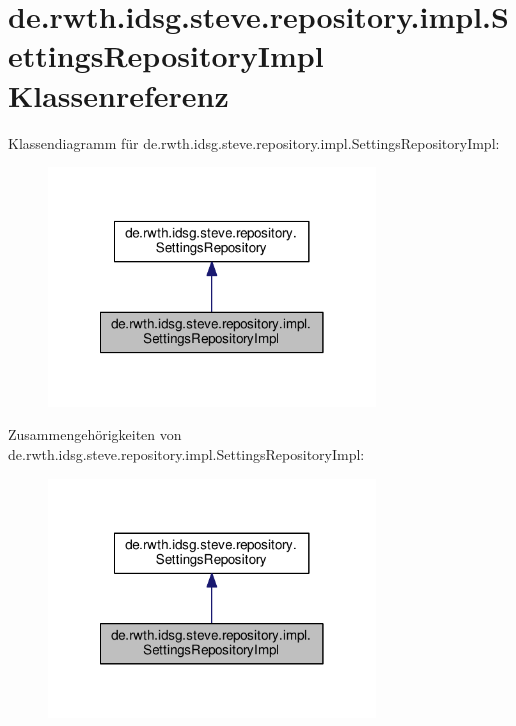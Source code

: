 \hypertarget{classde_1_1rwth_1_1idsg_1_1steve_1_1repository_1_1impl_1_1_settings_repository_impl}{\section{de.\-rwth.\-idsg.\-steve.\-repository.\-impl.\-Settings\-Repository\-Impl Klassenreferenz}
\label{classde_1_1rwth_1_1idsg_1_1steve_1_1repository_1_1impl_1_1_settings_repository_impl}
}


Klassendiagramm für de.\-rwth.\-idsg.\-steve.\-repository.\-impl.\-Settings\-Repository\-Impl\-:\nopagebreak
\begin{figure}[H]
\begin{center}
\leavevmode
\includegraphics[width=246pt]{classde_1_1rwth_1_1idsg_1_1steve_1_1repository_1_1impl_1_1_settings_repository_impl__inherit__graph}
\end{center}
\end{figure}


Zusammengehörigkeiten von de.\-rwth.\-idsg.\-steve.\-repository.\-impl.\-Settings\-Repository\-Impl\-:\nopagebreak
\begin{figure}[H]
\begin{center}
\leavevmode
\includegraphics[width=246pt]{classde_1_1rwth_1_1idsg_1_1steve_1_1repository_1_1impl_1_1_settings_repository_impl__coll__graph}
\end{center}
\end{figure}
